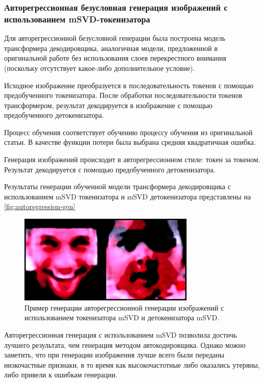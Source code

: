 \subsubsection{Авторегрессионная безусловная генерация изображений с использованием mSVD-токенизатора}

Для авторегрессионной безусловной генерации была построена модель трансформера декодировщика, аналогичная модели, предложенной в оригинальной работе \cite{transformer} без использования слоев перекрестного внимания (поскольку отсутствует какое-либо дополнительное условие).

Исходное изображение преобразуется в последовательность токенов с помощью предобученного токенизатора. После обработки последовательности токенов трансформером, результат декодируется в изображение с помощью предобученного детокенизатора.

Процесс обучения соответствует обучению процессу обучения из оригинальной статьи. В качестве функции потери была выбрана средняя квадратичная ошибка.

Генерация изображений происходит в авторегрессионном стиле: токен за токеном. Результат декодируется с помощью предобученного детокенизатора.


Результаты генерации обученной модели трансформера декодировщика с использованием mSVD токенизатора и mSVD детокенизатора представлены на \autoref{fig:autoregression-gen}

\begin{figure}[H]
    \centering
    \includegraphics[width=0.75\textwidth]
    {images/generation/autoregression_gen.png}
    \caption{Пример генерации авторегрессионной генерации изображений с использованием токенизатора mSVD и детокенизатора mSVD.}
    \label{fig:autoregression-gen}
\end{figure}

Авторегрессионная генерация с использованием mSVD позволила достичь лучшего результата, чем генерация методом автокодировщика. Однако можно заметить, что при генерации изображения лучше всего были переданы низкочастные признаки, в то время как высокочастотные либо оказались утеряны, либо привели к ошибкам генерации.

